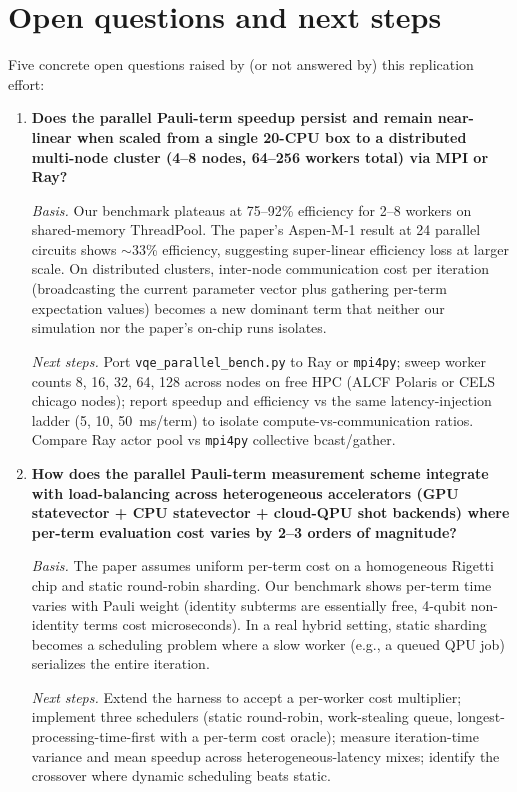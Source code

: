 \section{Open questions and next steps}

Five concrete open questions raised by (or not answered by) this replication effort:

\begin{enumerate}

\item \textbf{Does the parallel Pauli-term speedup persist and remain near-linear when scaled from a single 20-CPU box to a distributed multi-node cluster (4--8 nodes, 64--256 workers total) via MPI or Ray?}

\emph{Basis.} Our benchmark plateaus at 75--92\% efficiency for 2--8 workers on shared-memory ThreadPool. The paper's Aspen-M-1 result at 24 parallel circuits shows $\sim$33\% efficiency, suggesting super-linear efficiency loss at larger scale. On distributed clusters, inter-node communication cost per iteration (broadcasting the current parameter vector plus gathering per-term expectation values) becomes a new dominant term that neither our simulation nor the paper's on-chip runs isolates.

\emph{Next steps.} Port \texttt{vqe\_parallel\_bench.py} to Ray or \texttt{mpi4py}; sweep worker counts 8, 16, 32, 64, 128 across nodes on free HPC (ALCF Polaris or CELS chicago nodes); report speedup and efficiency vs the same latency-injection ladder (5, 10, 50~ms/term) to isolate compute-vs-communication ratios. Compare Ray actor pool vs \texttt{mpi4py} collective bcast/gather.

\item \textbf{How does the parallel Pauli-term measurement scheme integrate with load-balancing across heterogeneous accelerators (GPU statevector + CPU statevector + cloud-QPU shot backends) where per-term evaluation cost varies by 2--3 orders of magnitude?}

\emph{Basis.} The paper assumes uniform per-term cost on a homogeneous Rigetti chip and static round-robin sharding. Our benchmark shows per-term time varies with Pauli weight (identity subterms are essentially free, 4-qubit non-identity terms cost microseconds). In a real hybrid setting, static sharding becomes a scheduling problem where a slow worker (e.g., a queued QPU job) serializes the entire iteration.

\emph{Next steps.} Extend the harness to accept a per-worker cost multiplier; implement three schedulers (static round-robin, work-stealing queue, longest-processing-time-first with a per-term cost oracle); measure iteration-time variance and mean speedup across heterogeneous-latency mixes; identify the crossover where dynamic scheduling beats static.


\end{enumerate}
